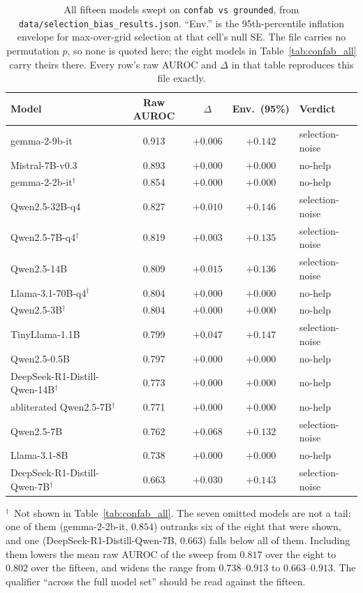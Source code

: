 \documentclass[11pt,a4paper]{article}
\begin{document}
\begin{table}[h]
\centering
\caption{All fifteen models swept on \texttt{confab vs grounded}, from
\texttt{data/selection\_bias\_results.json}. ``Env.'' is the 95th-percentile
inflation envelope for max-over-grid selection at that cell's null SE. The
file carries no permutation $p$, so none is quoted here; the eight models in
Table~\ref{tab:confab_all} carry theirs there. Every row's raw AUROC and
$\Delta$ in that table reproduces this file exactly.}
\label{tab:confab_all15}
\begin{tabular}{lcccl}
\toprule
\textbf{Model} & \textbf{Raw AUROC} & \textbf{$\Delta$} & \textbf{Env.\ (95\%)} & \textbf{Verdict} \\
\midrule
gemma-2-9b-it & 0.913 & $+0.006$ & $+0.142$ & selection-noise \\
Mistral-7B-v0.3 & 0.893 & $+0.000$ & $+0.000$ & no-help \\
gemma-2-2b-it$^{\dagger}$ & 0.854 & $+0.000$ & $+0.000$ & no-help \\
Qwen2.5-32B-q4 & 0.827 & $+0.010$ & $+0.146$ & selection-noise \\
Qwen2.5-7B-q4$^{\dagger}$ & 0.819 & $+0.003$ & $+0.135$ & selection-noise \\
Qwen2.5-14B & 0.809 & $+0.015$ & $+0.136$ & selection-noise \\
Llama-3.1-70B-q4$^{\dagger}$ & 0.804 & $+0.000$ & $+0.000$ & no-help \\
Qwen2.5-3B$^{\dagger}$ & 0.804 & $+0.000$ & $+0.000$ & no-help \\
TinyLlama-1.1B & 0.799 & $+0.047$ & $+0.147$ & selection-noise \\
Qwen2.5-0.5B & 0.797 & $+0.000$ & $+0.000$ & no-help \\
DeepSeek-R1-Distill-Qwen-14B$^{\dagger}$ & 0.773 & $+0.000$ & $+0.000$ & no-help \\
abliterated Qwen2.5-7B$^{\dagger}$ & 0.771 & $+0.000$ & $+0.000$ & no-help \\
Qwen2.5-7B & 0.762 & $+0.068$ & $+0.132$ & selection-noise \\
Llama-3.1-8B & 0.738 & $+0.000$ & $+0.000$ & no-help \\
DeepSeek-R1-Distill-Qwen-7B$^{\dagger}$ & 0.663 & $+0.030$ & $+0.143$ & selection-noise \\
\bottomrule
\end{tabular}
\end{table}

$^{\dagger}$~Not shown in Table~\ref{tab:confab_all}. The seven omitted models
are not a tail: one of them (gemma-2-2b-it, $0.854$) outranks six of the eight
that were shown, and one (DeepSeek-R1-Distill-Qwen-7B, $0.663$) falls below all
of them. Including them lowers the mean raw AUROC of the sweep from $0.817$
over the eight to $0.802$ over the fifteen, and widens the range from
$0.738$--$0.913$ to $0.663$--$0.913$. The qualifier ``across the full model
set'' should be read against the fifteen.
\end{document}
